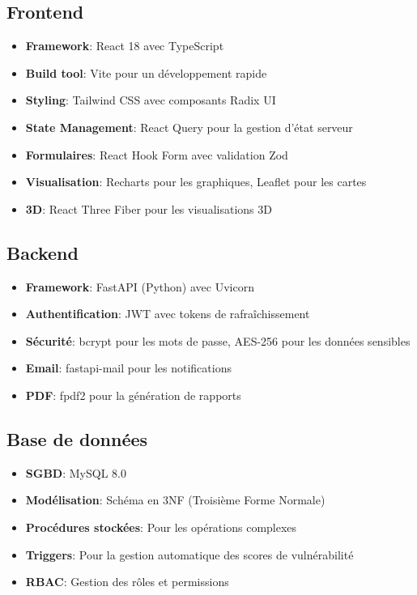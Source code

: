\documentclass[12pt,a4paper]{article}
\begin{document}
\subsection{Frontend}
\begin{itemize}
    \item \textbf{Framework}: React 18 avec TypeScript
    \item \textbf{Build tool}: Vite pour un développement rapide
    \item \textbf{Styling}: Tailwind CSS avec composants Radix UI
    \item \textbf{State Management}: React Query pour la gestion d'état serveur
    \item \textbf{Formulaires}: React Hook Form avec validation Zod
    \item \textbf{Visualisation}: Recharts pour les graphiques, Leaflet pour les cartes
    \item \textbf{3D}: React Three Fiber pour les visualisations 3D
\end{itemize}

\subsection{Backend}
\begin{itemize}
    \item \textbf{Framework}: FastAPI (Python) avec Uvicorn
    \item \textbf{Authentification}: JWT avec tokens de rafraîchissement
    \item \textbf{Sécurité}: bcrypt pour les mots de passe, AES-256 pour les données sensibles
    \item \textbf{Email}: fastapi-mail pour les notifications
    \item \textbf{PDF}: fpdf2 pour la génération de rapports
\end{itemize}

\subsection{Base de données}
\begin{itemize}
    \item \textbf{SGBD}: MySQL 8.0
    \item \textbf{Modélisation}: Schéma en 3NF (Troisième Forme Normale)
    \item \textbf{Procédures stockées}: Pour les opérations complexes
    \item \textbf{Triggers}: Pour la gestion automatique des scores de vulnérabilité
    \item \textbf{RBAC}: Gestion des rôles et permissions
\end{itemize}
\end{document}
